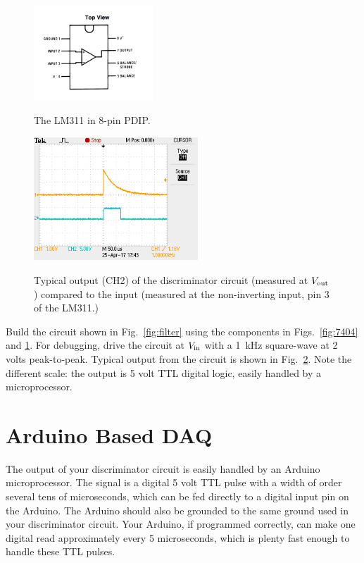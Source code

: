 \documentclass[12pt]{article}
\begin{document}
\begin{figure}[thbp]
\begin{center}
{\includegraphics[width=0.40\textwidth]{figs/LM311.png}}
\caption{\label{fig:lm311} The LM311 in 8-pin PDIP.}
\end{center}
\end{figure}

\begin{figure}[htbp]
\begin{center}
{\includegraphics[width=0.55\textwidth]{figs/discrim_out.jpg}}
\end{center}
\caption{\label{fig:typout} Typical output (CH2) of the discriminator circuit (measured at $V_{\rm out}$) compared to the input (measured at the non-inverting input, pin 3 of the LM311.) }
\end{figure}

Build the circuit shown in Fig.~\ref{fig:filter} using the components in Figs.~\ref{fig:7404} and \ref{fig:lm311}.  For debugging, drive the circuit at $V_{\rm in}$ with a 1~kHz square-wave at 2 volts peak-to-peak.  Typical output from the circuit is shown in Fig.~\ref{fig:typout}.  Note the different scale:  the output is 5 volt TTL digital logic, easily handled by a microprocessor.

\section{Arduino Based DAQ}

The output of your discriminator circuit is easily handled by an Arduino microprocessor.  The signal is a digital 5 volt TTL pulse with a width of order several tens of microseconds, which can be fed directly to a digital input pin on the Arduino.  The Arduino should also be grounded to the same ground used in your discriminator circuit.  Your Arduino, if programmed correctly, can make one digital read approximately every 5 microseconds, which is plenty fast enough to handle these TTL pulses.
\end{document}
